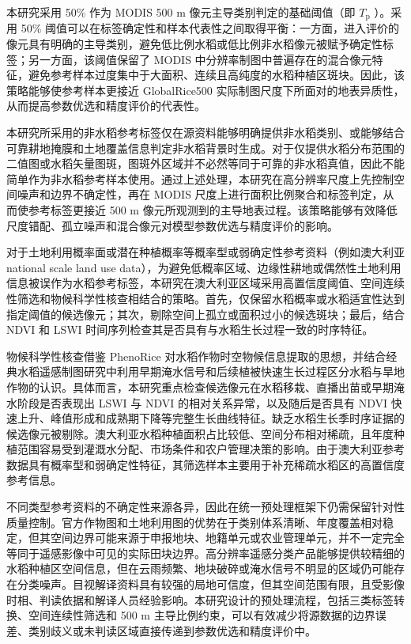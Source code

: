 本研究采用 50\% 作为 MODIS 500 m 像元主导类别判定的基础阈值（即 $T_{\mathrm{p}}$ ）。采用 50\% 阈值可以在标签确定性和样本代表性之间取得平衡：一方面，进入评价的像元具有明确的主导类别，避免低比例水稻或低比例非水稻像元被赋予确定性标签；另一方面，该阈值保留了 MODIS 中分辨率制图中普遍存在的混合像元特征，避免参考样本过度集中于大面积、连续且高纯度的水稻种植区斑块。因此，该策略能够使参考样本更接近 GlobalRice500 实际制图尺度下所面对的地表异质性，从而提高参数优选和精度评价的代表性。

本研究所采用的非水稻参考标签仅在源资料能够明确提供非水稻类别、或能够结合可靠耕地掩膜和土地覆盖信息判定非水稻背景时生成。对于仅提供水稻分布范围的二值图或水稻矢量图斑，图斑外区域并不必然等同于可靠的非水稻真值，因此不能简单作为非水稻参考样本使用。通过上述处理，本研究在高分辨率尺度上先控制空间噪声和边界不确定性，再在 MODIS 尺度上进行面积比例聚合和标签判定，从而使参考标签更接近 500 m 像元所观测到的主导地表过程。该策略能够有效降低尺度错配、孤立噪声和混合像元对模型参数优选与精度评价的影响。

对于土地利用概率面或潜在种植概率等概率型或弱确定性参考资料（例如澳大利亚 national scale land use data），为避免低概率区域、边缘性耕地或偶然性土地利用信息被误作为水稻参考标签，本研究在澳大利亚区域采用高置信度阈值、空间连续性筛选和物候科学性核查相结合的策略。首先，仅保留水稻概率或水稻适宜性达到指定阈值的候选像元；其次，剔除空间上孤立或面积过小的候选斑块；最后，结合 NDVI 和 LSWI 时间序列检查其是否具有与水稻生长过程一致的时序特征。

物候科学性核查借鉴 PhenoRice \cite{Boschetti2017RSE}对水稻作物时空物候信息提取的思想，并结合经典水稻遥感制图研究中利用早期淹水信号和后续植被快速生长过程区分水稻与旱地作物的认识\cite{Xiao2005,Xiao2006,Dong2016}。具体而言，本研究重点检查候选像元在水稻移栽、直播出苗或早期淹水阶段是否表现出 LSWI 与 NDVI 的相对关系异常，以及随后是否具有 NDVI 快速上升、峰值形成和成熟期下降等完整生长曲线特征。缺乏水稻生长季时序证据的候选像元被剔除。澳大利亚水稻种植面积占比较低、空间分布相对稀疏，且年度种植范围容易受到灌溉水分配、市场条件和农户管理决策的影响。由于澳大利亚参考数据具有概率型和弱确定性特征，其筛选样本主要用于补充稀疏水稻区的高置信度参考信息。

不同类型参考资料的不确定性来源各异，因此在统一预处理框架下仍需保留针对性质量控制。官方作物图和土地利用图的优势在于类别体系清晰、年度覆盖相对稳定，但其空间边界可能来源于申报地块、地籍单元或农业管理单元，并不一定完全等同于遥感影像中可见的实际田块边界。高分辨率遥感分类产品能够提供较精细的水稻种植区空间信息，但在云雨频繁、地块破碎或淹水信号不明显的区域仍可能存在分类噪声。目视解译资料具有较强的局地可信度，但其空间范围有限，且受影像时相、判读依据和解译人员经验影响。本研究设计的预处理流程，包括三类标签转换、空间连续性筛选和 500 m 主导比例约束，可以有效减少将源数据的边界误差、类别歧义或未判读区域直接传递到参数优选和精度评价中。

